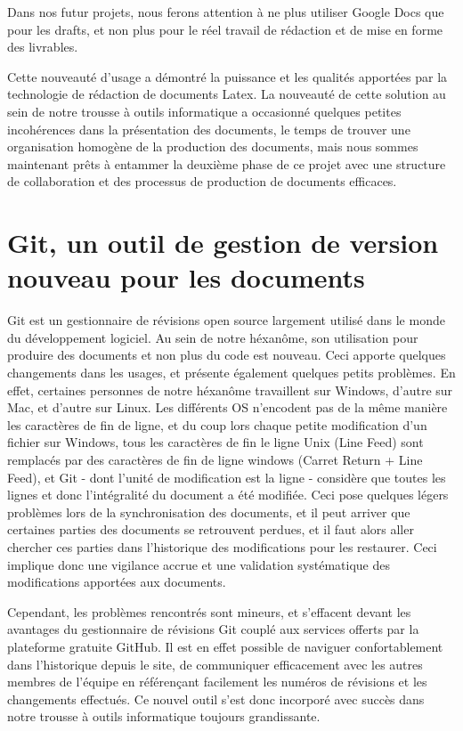 \documentclass[a4paper]{article}
\begin{document}
Dans nos futur projets, nous ferons attention à ne plus utiliser Google Docs que pour les drafts, et non plus pour le réel travail de rédaction et de mise en forme des livrables.

Cette nouveauté d'usage a démontré la puissance et les qualités apportées par la technologie de rédaction de documents Latex. La nouveauté de cette solution au sein de notre trousse à outils informatique a occasionné quelques petites incohérences dans la présentation des documents, le temps de trouver une organisation homogène de la production des documents, mais nous sommes maintenant prêts à entammer la deuxième phase de ce projet avec une structure de collaboration et des processus de production de documents efficaces.

\section{Git, un outil de gestion de version nouveau pour les documents}

Git est un gestionnaire de révisions open source largement utilisé dans le monde du développement logiciel. Au sein de notre héxanôme, son utilisation pour produire des documents et non plus du code est nouveau. Ceci apporte quelques changements dans les usages, et présente également quelques petits problèmes. En effet, certaines personnes de notre héxanôme travaillent sur Windows, d'autre sur Mac, et d'autre sur Linux. Les différents OS n'encodent pas de la même manière les caractères de fin de ligne, et du coup lors chaque petite modification d'un fichier sur Windows, tous les caractères de fin le ligne Unix (Line Feed) sont remplacés par des caractères de fin de ligne windows (Carret Return + Line Feed), et Git - dont l'unité de modification est la ligne - considère que toutes les lignes et donc l'intégralité du document a été modifiée. Ceci pose quelques légers problèmes lors de la synchronisation des documents, et il peut arriver que certaines parties des documents se retrouvent perdues, et il faut alors aller chercher ces parties dans l'historique des modifications pour les restaurer. Ceci implique donc une vigilance accrue et une validation systématique des modifications apportées aux documents.

Cependant, les problèmes rencontrés sont mineurs, et s'effacent devant les avantages du gestionnaire de révisions Git couplé aux services offerts par la plateforme gratuite GitHub. Il est en effet possible de naviguer confortablement dans l'historique depuis le site, de communiquer efficacement avec les autres membres de l'équipe en référençant facilement les numéros de révisions et les changements effectués. Ce nouvel outil s'est donc incorporé avec succès dans notre trousse à outils informatique toujours grandissante.
\end{document}
